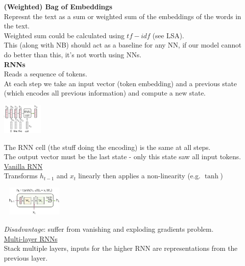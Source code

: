 \documentclass[8pt]{extarticle} %
\begin{document}
\begin{multicols*}{3}
\textbf{(Weighted) Bag of Embeddings}\\

Represnt the text as a sum or weighted sum of the embeddings of the words in the text.\\
Weighted sum could be calculated using $tf-idf$ (see LSA).\\

This (along with NB) should act as a baseline for any NN, if our model cannot do better than this, it's not worth using NNs.\\ 

\textbf{RNNs}\\

Reads a sequence of tokens.\\
At each step we take an input vector (token embedding) and a previous state (which encodes all previous information) and compute a new state. 
\begin{center}
\includegraphics*[width=0.15\textwidth]{media/rnn-cell.png}
\end{center}
The RNN cell (the stuff doing the encoding) is the same at all steps.\\

The output vector must be the last state - only this state saw all input tokens.\\  

\underline{Vanilla RNN}\\

Transforms $h_{t-1}$ and $x_t$ linearly then applies a non-linearity (e.g. $\tanh$) 
\begin{center}
\includegraphics*[width=0.25\textwidth]{media/vanilla-rnn.png}
\end{center}
\textit{Disadvantage}: suffer from vanishing and exploding gradients problem.\\

\underline{Multi-layer RNNs}\\

Stack multiple layers, inputs for the higher RNN are representations from the previous layer.\\


\end{multicols*}
\end{document}
